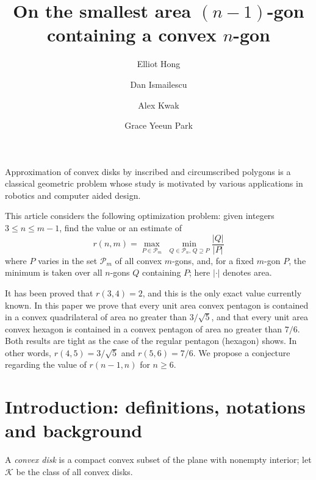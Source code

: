 \documentclass [10pt,oneside]{amsart}
\title{On the smallest area $(n-1)$-gon containing a convex $n$-gon}
\author{Elliot Hong}
\author{Dan Ismailescu}
\author{Alex Kwak}
\author{Grace Yeeun Park}
\theoremstyle{definition}
\theoremstyle{plain}
\begin{document}
\maketitle





\bigskip

\begin{tcolorbox}
Approximation of convex disks by inscribed and circumscribed polygons is a classical geometric problem whose study is motivated by various applications in robotics and computer aided design.

This article considers the following optimization problem: given integers $3\le n\le m-1$, find the value or an estimate of
\begin{equation*}
r(n,m)=\max_{P\in \mathcal {P}_m}\,\, \min_{Q\in \mathcal {P}_n,\,Q \supseteq P}
\frac{|Q|}{|P|}
\end{equation*}
where $P$ varies in the set $\mathcal {P}_m$ of all convex $m$-gons, and, for a fixed $m$-gon $P$, the minimum is taken over all $n$-gons $Q$ containing $P$; here $|\cdot|$ denotes area.

It has been proved that $r(3,4)=2$, and this is the only exact value currently known.
In this paper we prove that every unit area convex pentagon is contained in a convex quadrilateral of area no greater than $3/\sqrt{5}$, and that every unit area convex hexagon is contained in a convex pentagon of area no greater than $7/6$. Both results are tight as the case of the regular pentagon (hexagon) shows. In other words, $r(4,5)=3/\sqrt{5}$ and $r(5,6)=7/6$. We propose a conjecture regarding the value of $r(n-1,n)$ for $n\ge 6$.
\end{tcolorbox}



\section{\bf Introduction: definitions, notations and background}

A \emph{convex disk} is a compact convex subset of the plane with nonempty interior; let $\mathcal{K}$ be the class of all convex disks.
\end{document}

